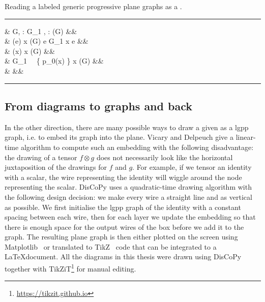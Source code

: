 \begin{python}\label{listing:lgpp2diagram}
{\normalfont Reading a labeled generic progressive plane graphs as a .}
\vspace{5pt}
\hrule
\vspace{-15pt}
\begin{flalign*}
 \s &  \s G, \s \lambda : G_1 \to {}, \s \lambda : \boxes(G) \to {} \s {}&&\\
& \py{dom = [} \s \lambda(e) \s {} \s x \in \dom(G) \s {} \s e \in G_1 \s {} \s x \in \partial e \s \py{]}&&\\
& \py{boxes = [} \s \lambda(x) \s {} \s x \in \boxes(G) \s \py{]}&&\\
& \py{offsets = [len(} \s G_1 \ \cap \ \{ p_0(x) \} \times \R \s {} \s x \in \boxes(G) \s \py{]}&&\\
&  &&
\vspace{-10pt}
\end{flalign*}
\hrule
\end{python}

\subsection{From diagrams to graphs and back}

In the other direction, there are many possible ways to draw a given  as a lgpp graph, i.e. to embed its graph into the plane.
Vicary and Delpeuch \cite{DelpeuchVicary18} give a linear-time algorithm to compute such an embedding with the following disadvantage: the drawing of a tensor $f \otimes g$ does not necessarily look like the horizontal juxtaposition of the drawings for $f$ and $g$.
For example, if we tensor an identity with a scalar, the wire representing the identity will wiggle around the node representing the scalar.
DisCoPy uses a quadratic-time drawing algorithm with the following design decision: we make every wire a straight line and as vertical as possible.
We first initialise the lgpp graph of the identity with a constant spacing between each wire, then for each layer we update the embedding so that there is enough space for the output wires of the box before we add it to the graph.
The resulting plane graph is then either plotted on the screen using Matplotlib~\cite{Hunter07} or translated to TikZ~\cite{Tantau13} code that can be integrated to a \LaTeX document.
All the diagrams in this thesis were drawn using DisCoPy together with TikZiT\footnote{\url{https://tikzit.github.io}} for manual editing.

